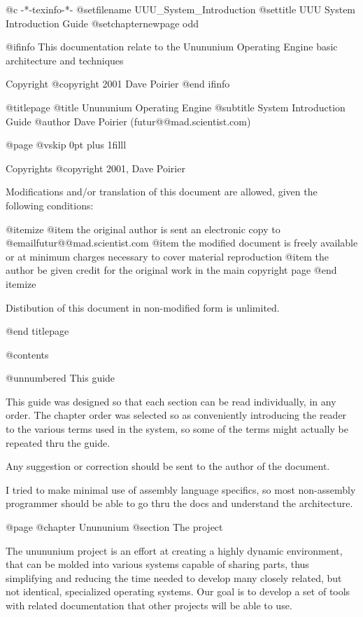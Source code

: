  @c -*-texinfo-*-
@setfilename UUU_System_Introduction
@settitle UUU System Introduction Guide
@setchapternewpage odd

@ifinfo
This documentation relate to the Unununium Operating Engine basic architecture and techniques

Copyright @copyright{} 2001 Dave Poirier
@end ifinfo

@titlepage
@title Unununium Operating Engine
@subtitle System Introduction Guide
@author Dave Poirier (futur@@mad.scientist.com)

@page
@vskip 0pt plus 1filll

Copyrights @copyright{} 2001, Dave Poirier

Modifications and/or translation of this document are allowed, given the
following conditions:

@itemize
@item the original author is sent an electronic copy to @email{futur@@mad.scientist.com}
@item the modified document is freely available or at minimum charges necessary to cover material reproduction
@item the author be given credit for the original work in the main copyright page
@end itemize

Distibution of this document in non-modified form is unlimited.

@end titlepage

@contents

@unnumbered This guide

This guide was designed so that each section can be read individually, in any
order.  The chapter order was selected so as conveniently introducing the
reader to the various terms used in the system, so some of the terms might
actually be repeated thru the guide.

Any suggestion or correction should be sent to the author of the document.

I tried to make minimal use of assembly language specifics, so most
non-assembly programmer should be able to go thru the docs and understand the
architecture.


@page
@chapter Unununium
@section The project

The unununium project is an effort at creating a highly dynamic environment,
that can be molded into various systems capable of sharing parts,
thus simplifying and reducing the time needed to develop many closely related,
but not identical, specialized operating systems. Our goal is to develop a set
of tools with related documentation that other projects will be able to use.

